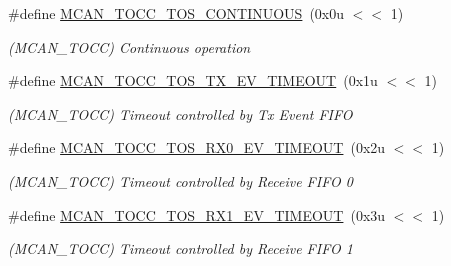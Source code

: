 \begin{DoxyCompactItemize}
\item 
\mbox{\label{group__SAME70__MCAN_ga1c27ca83f8fd7dc06c2fc74a5944ead1}} 
\#define \mbox{\hyperlink{group__SAME70__MCAN_ga1c27ca83f8fd7dc06c2fc74a5944ead1}{M\+C\+A\+N\+\_\+\+T\+O\+C\+C\+\_\+\+T\+O\+S\+\_\+\+C\+O\+N\+T\+I\+N\+U\+O\+US}}~(0x0u $<$$<$ 1)
\begin{DoxyCompactList}\small\item\em (M\+C\+A\+N\+\_\+\+T\+O\+CC) Continuous operation \end{DoxyCompactList}\item 
\mbox{\label{group__SAME70__MCAN_ga608fbab46a4f76585d9aab1af59c9ca9}} 
\#define \mbox{\hyperlink{group__SAME70__MCAN_ga608fbab46a4f76585d9aab1af59c9ca9}{M\+C\+A\+N\+\_\+\+T\+O\+C\+C\+\_\+\+T\+O\+S\+\_\+\+T\+X\+\_\+\+E\+V\+\_\+\+T\+I\+M\+E\+O\+UT}}~(0x1u $<$$<$ 1)
\begin{DoxyCompactList}\small\item\em (M\+C\+A\+N\+\_\+\+T\+O\+CC) Timeout controlled by Tx Event F\+I\+FO \end{DoxyCompactList}\item 
\mbox{\label{group__SAME70__MCAN_ga8f8d78bf62c60aef1b66b89d578942f5}} 
\#define \mbox{\hyperlink{group__SAME70__MCAN_ga8f8d78bf62c60aef1b66b89d578942f5}{M\+C\+A\+N\+\_\+\+T\+O\+C\+C\+\_\+\+T\+O\+S\+\_\+\+R\+X0\+\_\+\+E\+V\+\_\+\+T\+I\+M\+E\+O\+UT}}~(0x2u $<$$<$ 1)
\begin{DoxyCompactList}\small\item\em (M\+C\+A\+N\+\_\+\+T\+O\+CC) Timeout controlled by Receive F\+I\+FO 0 \end{DoxyCompactList}\item 
\mbox{\label{group__SAME70__MCAN_ga9c6c59f2ca37f1b880feb3628b656895}} 
\#define \mbox{\hyperlink{group__SAME70__MCAN_ga9c6c59f2ca37f1b880feb3628b656895}{M\+C\+A\+N\+\_\+\+T\+O\+C\+C\+\_\+\+T\+O\+S\+\_\+\+R\+X1\+\_\+\+E\+V\+\_\+\+T\+I\+M\+E\+O\+UT}}~(0x3u $<$$<$ 1)
\begin{DoxyCompactList}\small\item\em (M\+C\+A\+N\+\_\+\+T\+O\+CC) Timeout controlled by Receive F\+I\+FO 1 \end{DoxyCompactList}\item 
\mbox{\label{group__SAME70__MCAN_ga5159987645c490d9c0c27b5d9c374571}} 

\end{DoxyCompactItemize}

